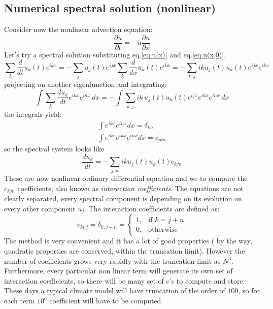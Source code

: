 \subsection{Numerical spectral solution (nonlinear)}
Consider now the nonlinear advection equation:
\begin{equation}
    \frac{\partial u}{\partial t}=-u\frac{\partial u}{\partial x}
\end{equation}
Let's try a spectral solution substituting eq.\ref{eq.u(x)} and eq.\ref{eq.u(x,0)}, 
\[
\sum_k \frac{d}{dt} u_k(t) e^{ikx} = -\sum_j u_j(t) e^{ijx}
\sum_k \frac{d}{dx} u_k(t) e^{ikx} = -\sum_{k,j} ik u_j(t) u_k(t) e^{ijx} e^{ikx}
\]
projecting on another eigenfunction and integrating:
\[
\int \sum_k \frac{du_k}{dt} e^{ikx} e^{inx} \, dx = 
- \int \sum_{k,j} ik \, u_j(t) u_k(t) e^{ijx} e^{ikx} e^{inx} \, dx
\]
the integrals yield: 
\begin{align*}
    \int e^{ikx}e^{inx}dx=\delta_{kn} \\
    \int e^{ikx}e^{ikx}e^{inx}dx=c_{ikn}
\end{align*}
so the spectral system looks like 
\begin{equation}\label{eq.spectral system nonlinear}
    \frac{du_k}{dt}=-\displaystyle\sum_{j,n}iku_j(t)u_k(t)c_{kjn}
    \end{equation}
These are now nonlinear ordinary differential equation and we to compute the $c_{kjn}$ coefficients, also known as \textit{interaction coefficients}. The equations are not clearly separated, every spectral component is depending on its evolution on every other component $u_j$. 
The interaction coefficients are defined as: 
\begin{equation}
    c_{knj}=\delta_{k,j+n}=\begin{cases}
        1, &\text{if $k=j+n$}\\
        0, &\text{otherwise}
    \end{cases}
\end{equation}
The method is very convenient and it has a lot of good properties ( by the way,
quadratic properties are conserved, within the truncation limit). However the
number of coefficients grows very rapidly with the truncation limit as $N^3$.
Furthermore, every particular non linear term will generate its own set of
interaction coefficients, so there will be many set of c’s to compute and store.
These days a typical climate model will have truncation of the order of $100$, so
for each term $10^6$ coefficient will have to be computed.

